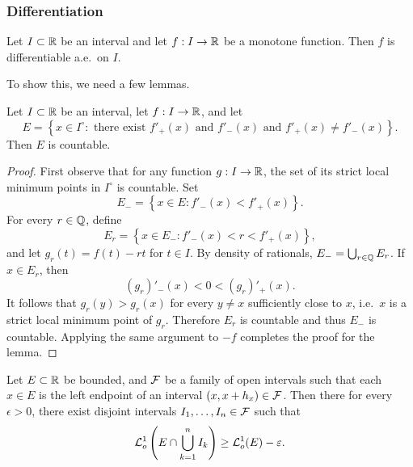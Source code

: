 \documentclass[a4paper]{article}
\begin{document}
\subsubsection*{Differentiation}

\begin{thm}
  Let $I \subset \mathbb{R}$ be an interval and let $f : I \to \mathbb{R}$ be a monotone
  function. Then $f$ is differentiable a.e.\ on $I$.
\end{thm}

To show this, we need a few lemmas.

\begin{lemma}
  Let $I \subset \mathbb{R}$ be an interval, let $f : I \to \mathbb{R}$, and let
  \[
    E = \left\{ x \in I^\circ : \text{ there exist $f'_+ (x)$ and
  $f'_- (x)$ and $f'_+(x) \neq f'_-(x)$} \right\}.
  \]
  Then $E$ is countable.
\end{lemma}

\begin{proof}
  First observe that for any function $g: I \to \mathbb{R}$, the set of its strict
  local minimum points in $I^\circ$ is countable. Set
  \[
    E_- = \left\{ x \in E : f'_-(x) < f'_+ (x) \right\}.
  \]
  For every $r \in \mathbb{Q}$, define
  \[
    E_r = \left\{ x \in E_- : f'_-(x) < r < f'_+ (x) \right\},
  \]
  and let $g_r(t) = f(t) - rt$ for $t \in I$. By density of rationals,
  $E_- = \bigcup_{r \in \mathbb{Q}} E_r$. If $x \in E_r$, then
  \[
    (g_r)'_- (x) < 0 < (g_r)'_+ (x).
  \]
  It follows that $g_r(y) > g_r(x)$ for every $y \neq x$ sufficiently
  close to $x$, i.e.\ $x$ is a strict local minimum point of $g_r$.
  Therefore $E_r$ is countable and thus $E_-$ is countable. Applying the
  same argument to $-f$ completes the proof for the lemma.
\end{proof}

\begin{lemma}
  Let $E \subset \mathbb{R}$ be bounded, and $\mathcal{F}$ be a family of open intervals
  such that each $x \in E$ is the left endpoint of an interval $(x, x +
    h_x) \in \mathcal{F}$. Then there for every $\epsilon > 0$, there exist
  disjoint intervals $I_1, \dots, I_n \in \mathcal{F}$ such that
  \[
    \mathcal{L}_o^1 \left( E \cap \bigcup_{k=1}^n I_k \right)  \geq \mathcal{L}_o^1 (E) - \varepsilon.
  \]
\end{lemma}
\end{document}
